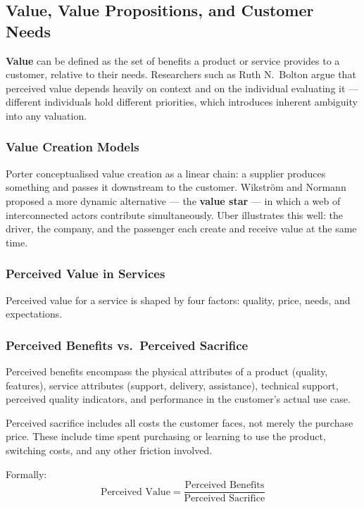 \subsection*{Value, Value Propositions, and Customer Needs}

\textbf{Value} can be defined as the set of benefits a product or service provides to a 
customer, relative to their needs. Researchers such as Ruth N.\ Bolton argue that perceived 
value depends heavily on context and on the individual evaluating it --- different individuals 
hold different priorities, which introduces inherent ambiguity into any valuation.

\subsubsection*{Value Creation Models}

Porter conceptualised value creation as a linear chain: a supplier produces something and 
passes it downstream to the customer. Wikström and Normann proposed a more dynamic 
alternative --- the \textbf{value star} --- in which a web of interconnected actors 
contribute simultaneously. Uber illustrates this well: the driver, the company, and the 
passenger each create and receive value at the same time.

\subsubsection*{Perceived Value in Services}

Perceived value for a service is shaped by four factors: quality, price, needs, and 
expectations.

\subsubsection*{Perceived Benefits vs.\ Perceived Sacrifice}

Perceived benefits encompass the physical attributes of a product (quality, features), 
service attributes (support, delivery, assistance), technical support, perceived quality 
indicators, and performance in the customer's actual use case.

Perceived sacrifice includes all costs the customer faces, not merely the purchase price. 
These include time spent purchasing or learning to use the product, switching costs, and 
any other friction involved.

Formally:
\[
    \text{Perceived Value} = \frac{\text{Perceived Benefits}}{\text{Perceived Sacrifice}}
\]

